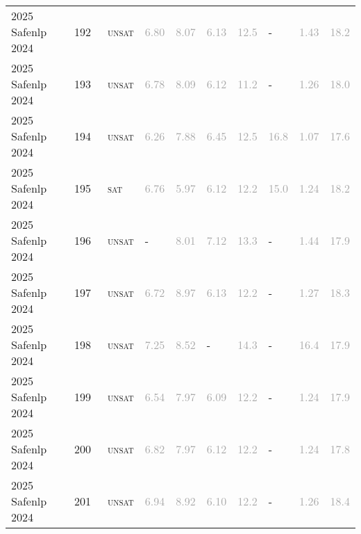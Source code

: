 \begin{center}
{\begin{longtable}{@{}llllllllll@{}}
2025 Safenlp 2024 & 192 & ~\textsc{unsat} & \textcolor{darkgray}{6.80} & \textcolor{darkgray}{8.07} & \textcolor{darkgray}{6.13} & \textcolor{darkgray}{12.5} & - & \textcolor{darkgray}{1.43} & \textcolor{darkgray}{18.2} \\
2025 Safenlp 2024 & 193 & ~\textsc{unsat} & \textcolor{darkgray}{6.78} & \textcolor{darkgray}{8.09} & \textcolor{darkgray}{6.12} & \textcolor{darkgray}{11.2} & - & \textcolor{darkgray}{1.26} & \textcolor{darkgray}{18.0} \\
2025 Safenlp 2024 & 194 & ~\textsc{unsat} & \textcolor{darkgray}{6.26} & \textcolor{darkgray}{7.88} & \textcolor{darkgray}{6.45} & \textcolor{darkgray}{12.5} & \textcolor{darkgray}{16.8} & \textcolor{darkgray}{1.07} & \textcolor{darkgray}{17.6} \\
2025 Safenlp 2024 & 195 & ~\textsc{sat} & \textcolor{darkgray}{6.76} & \textcolor{darkgray}{5.97} & \textcolor{darkgray}{6.12} & \textcolor{darkgray}{12.2} & \textcolor{darkgray}{15.0} & \textcolor{darkgray}{1.24} & \textcolor{darkgray}{18.2} \\
2025 Safenlp 2024 & 196 & ~\textsc{unsat} & - & \textcolor{darkgray}{8.01} & \textcolor{darkgray}{7.12} & \textcolor{darkgray}{13.3} & - & \textcolor{darkgray}{1.44} & \textcolor{darkgray}{17.9} \\
2025 Safenlp 2024 & 197 & ~\textsc{unsat} & \textcolor{darkgray}{6.72} & \textcolor{darkgray}{8.97} & \textcolor{darkgray}{6.13} & \textcolor{darkgray}{12.2} & - & \textcolor{darkgray}{1.27} & \textcolor{darkgray}{18.3} \\
2025 Safenlp 2024 & 198 & ~\textsc{unsat} & \textcolor{darkgray}{7.25} & \textcolor{darkgray}{8.52} & - & \textcolor{darkgray}{14.3} & - & \textcolor{darkgray}{16.4} & \textcolor{darkgray}{17.9} \\
2025 Safenlp 2024 & 199 & ~\textsc{unsat} & \textcolor{darkgray}{6.54} & \textcolor{darkgray}{7.97} & \textcolor{darkgray}{6.09} & \textcolor{darkgray}{12.2} & - & \textcolor{darkgray}{1.24} & \textcolor{darkgray}{17.9} \\
2025 Safenlp 2024 & 200 & ~\textsc{unsat} & \textcolor{darkgray}{6.82} & \textcolor{darkgray}{7.97} & \textcolor{darkgray}{6.12} & \textcolor{darkgray}{12.2} & - & \textcolor{darkgray}{1.24} & \textcolor{darkgray}{17.8} \\
2025 Safenlp 2024 & 201 & ~\textsc{unsat} & \textcolor{darkgray}{6.94} & \textcolor{darkgray}{8.92} & \textcolor{darkgray}{6.10} & \textcolor{darkgray}{12.2} & - & \textcolor{darkgray}{1.26} & \textcolor{darkgray}{18.4} \\

\end{longtable}}
\end{center}
